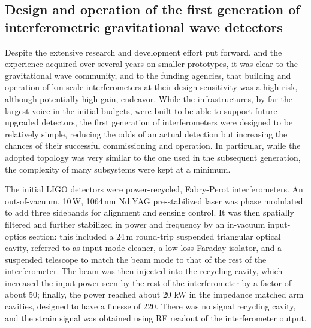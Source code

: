 \subsection{Design and operation of the first generation of interferometric gravitational wave detectors}\label{subsec:1stgen}

Despite the extensive research and development effort put forward, and the experience acquired over several years on smaller prototypes, it was clear to the gravitational wave community, and to the funding agencies, that building and operation of km-scale interferometers at their design sensitivity was a high risk, although potentially high gain, endeavor.
While the infrastructures, by far the largest voice in the initial budgets, were built to be able to support future upgraded detectors, the first generation of interferometers were designed to be relatively simple, reducing the odds of an actual detection but increasing the chances of their successful commissioning and operation.
In particular, while the adopted topology was very similar to the one used in the subsequent generation, the complexity of many subsystems were kept at a minimum.

The initial LIGO detectors\cite{Abbott_2004,Abbott_2009} were power-recycled, Fabry-Perot interferometers.
An out-of-vacuum, 10\,W, 1064\,nm Nd:YAG pre-stabilized laser was phase modulated to add three sidebands for alignment and sensing control.
It was then spatially filtered and further stabilized in power and frequency by an in-vacuum input-optics section: this included a 24\,m round-trip suspended triangular optical cavity, referred to as input mode cleaner, a low loss Faraday isolator, and a suspended telescope to match the beam mode to that of the rest of the interferometer.
The beam was then injected into the recycling cavity,
which increased the input power seen by the rest of the interferometer by a factor of about 50; finally, the power reached about 20 kW in the impedance matched arm cavities, designed to have a finesse of 220. There was no signal recycling cavity, and the strain signal was obtained using RF readout of the interferometer output.


